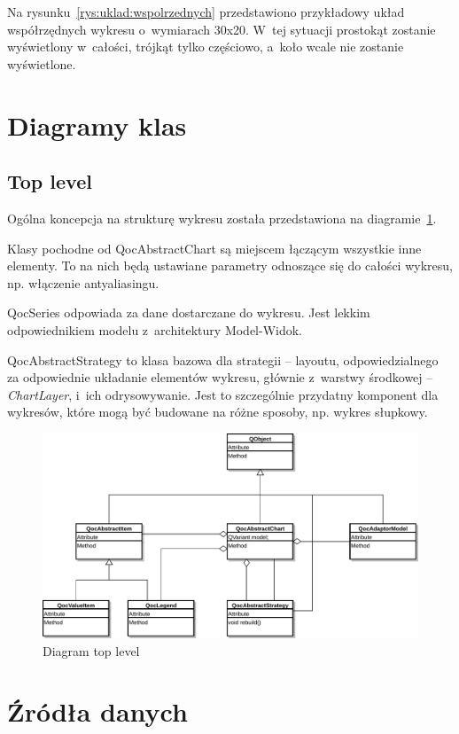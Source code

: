 Na rysunku~\ref{rys:uklad:wspolrzednych} przedstawiono przykładowy układ współrzędnych wykresu o~wymiarach 30x20. W~tej sytuacji prostokąt zostanie wyświetlony w~całości, trójkąt tylko częściowo, a~koło wcale nie zostanie wyświetlone.

\section{Diagramy klas}

\subsection{Top level}
Ogólna koncepcja na strukturę wykresu została przedstawiona na diagramie~\ref{rys:klasy:top_level}.

Klasy pochodne od QocAbstractChart są miejscem łączącym wszystkie inne elementy. To na nich będą ustawiane parametry odnoszące się do całości wykresu, np. włączenie antyaliasingu.

QocSeries odpowiada za dane dostarczane do wykresu. Jest lekkim odpowiednikiem modelu z~architektury Model-Widok.

QocAbstractStrategy to klasa bazowa dla strategii -- layoutu, odpowiedzialnego za odpowiednie układanie elementów wykresu, głównie z~warstwy środkowej -- \textit{ChartLayer}, i~ich odrysowywanie. Jest to szczególnie przydatny komponent dla wykresów, które mogą być budowane na różne sposoby, np. wykres słupkowy.


\begin{figure}
\centering
\caption{Diagram top level}\label{rys:klasy:top_level}
\includegraphics[scale=0.7]{img/klasy-top_level.pdf}
\end{figure}

\section{Źródła danych}

